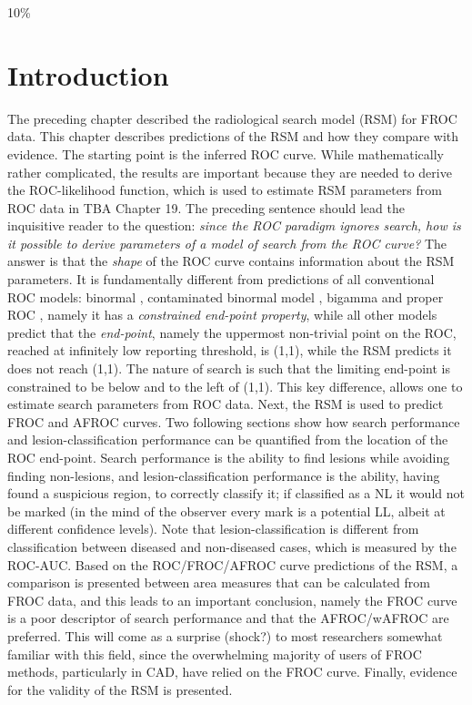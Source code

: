 \documentclass[
]{book}
\begin{document}
10\%

\hypertarget{rsm-goodbye-froc-intro}{%
\section{Introduction}\label{rsm-goodbye-froc-intro}}

The preceding chapter described the radiological search model (RSM) for FROC data. This chapter describes predictions of the RSM and how they compare with evidence. The starting point is the inferred ROC curve. While mathematically rather complicated, the results are important because they are needed to derive the ROC-likelihood function, which is used to estimate RSM parameters from ROC data in TBA Chapter 19. The preceding sentence should lead the inquisitive reader to the question: \emph{since the ROC paradigm ignores search, how is it possible to derive parameters of a model of search from the ROC curve?} The answer is that the \emph{shape} of the ROC curve contains information about the RSM parameters. It is fundamentally different from predictions of all conventional ROC models: binormal \citep{RN1081}, contaminated binormal model \citep{RN1501}, bigamma \citep{RN100} and proper ROC \citep{metz1999proper}, namely it has a \emph{constrained end-point property}, while all other models predict that the \emph{end-point}, namely the uppermost non-trivial point on the ROC, reached at infinitely low reporting threshold, is (1,1), while the RSM predicts it does not reach (1,1). The nature of search is such that the limiting end-point is constrained to be below and to the left of (1,1). This key difference, allows one to estimate search parameters from ROC data. Next, the RSM is used to predict FROC and AFROC curves. Two following sections show how search performance and lesion-classification performance can be quantified from the location of the ROC end-point. Search performance is the ability to find lesions while avoiding finding non-lesions, and lesion-classification performance is the ability, having found a suspicious region, to correctly classify it; if classified as a NL it would not be marked (in the mind of the observer every mark is a potential LL, albeit at different confidence levels). Note that lesion-classification is different from classification between diseased and non-diseased cases, which is measured by the ROC-AUC. Based on the ROC/FROC/AFROC curve predictions of the RSM, a comparison is presented between area measures that can be calculated from FROC data, and this leads to an important conclusion, namely the FROC curve is a poor descriptor of search performance and that the AFROC/wAFROC are preferred. This will come as a surprise (shock?) to most researchers somewhat familiar with this field, since the overwhelming majority of users of FROC methods, particularly in CAD, have relied on the FROC curve. Finally, evidence for the validity of the RSM is presented.
\end{document}
